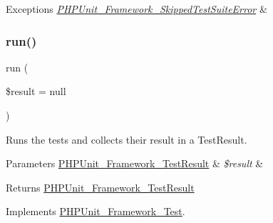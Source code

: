 \begin{DoxyExceptions}{Exceptions}
{\em \mbox{\hyperlink{class_p_h_p_unit___framework___skipped_test_suite_error}{P\+H\+P\+Unit\+\_\+\+Framework\+\_\+\+Skipped\+Test\+Suite\+Error}}} & \\
\hline
\end{DoxyExceptions}
\mbox{\label{class_p_h_p_unit___framework___test_suite_aba2e5a83092b40735a7a61c572cd6256}} 
\subsubsection{\texorpdfstring{run()}{run()}}
{\footnotesize\ttfamily run (\begin{DoxyParamCaption}\item[{\mbox{\hyperlink{class_p_h_p_unit___framework___test_result}{P\+H\+P\+Unit\+\_\+\+Framework\+\_\+\+Test\+Result}}}]{\$result = {\ttfamily null} }\end{DoxyParamCaption})}

Runs the tests and collects their result in a Test\+Result.


\begin{DoxyParams}[1]{Parameters}
\mbox{\hyperlink{class_p_h_p_unit___framework___test_result}{P\+H\+P\+Unit\+\_\+\+Framework\+\_\+\+Test\+Result}} & {\em \$result} & \\
\hline
\end{DoxyParams}
\begin{DoxyReturn}{Returns}
\mbox{\hyperlink{class_p_h_p_unit___framework___test_result}{P\+H\+P\+Unit\+\_\+\+Framework\+\_\+\+Test\+Result}} 
\end{DoxyReturn}


Implements \mbox{\hyperlink{interface_p_h_p_unit___framework___test_aba2e5a83092b40735a7a61c572cd6256}{P\+H\+P\+Unit\+\_\+\+Framework\+\_\+\+Test}}.

\mbox{\label{class_p_h_p_unit___framework___test_suite_ab3aa10e3edecc8f2b4175a3215f36b51}} 
